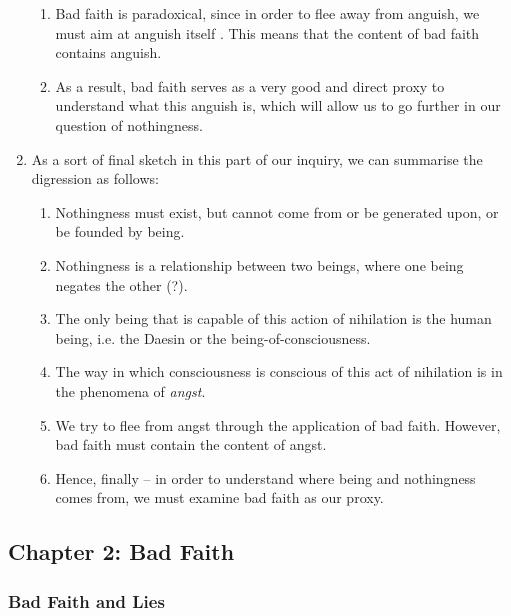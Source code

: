 \begin{enumerate}
  \begin{enumerate}
    \item Bad faith is paradoxical, since in order to flee away from anguish, we must aim at anguish itself \autocite[86]{sartre}. This means that the content of bad faith contains anguish.
    \item As a result, bad faith serves as a very good and direct proxy to understand what this anguish is, which will allow us to go further in our question of nothingness.
  \end{enumerate}
  \item As a sort of final sketch in this part of our inquiry, we can summarise the digression as follows:
  \begin{enumerate}
    \item Nothingness must exist, but cannot come from or be generated upon, or be founded by being.
    \item Nothingness is a relationship between two beings, where one being negates the other (?).
    \item The only being that is capable of this action of nihilation is the human being, i.e. the Daesin or the being-of-consciousness.
    \item The way in which consciousness is conscious of this act of nihilation is in the phenomena of \emph{angst}.
    \item We try to flee from angst through the application of bad faith. However, bad faith must contain the content of angst.
    \item Hence, finally -- in order to understand where being and nothingness comes from, we must examine bad faith as our proxy.
  \end{enumerate}
\end{enumerate}

\subsection{Chapter 2: Bad Faith}

\subsubsection{Bad Faith and Lies}

